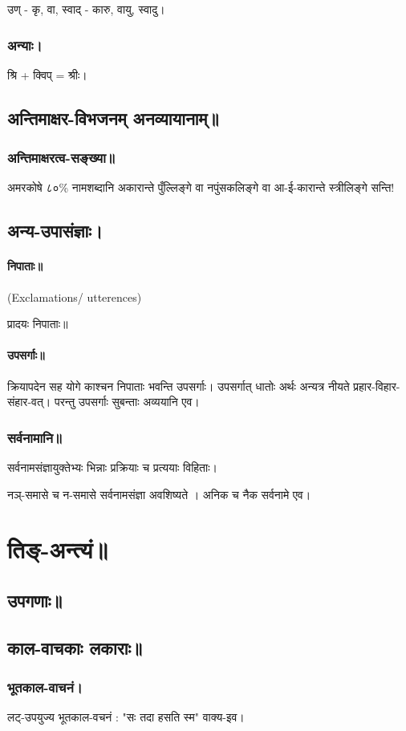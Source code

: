 \documentclass[oneside, article]{memoir}
\begin{document}
उण् - कृ, वा, स्वाद् - कारु, वायु, स्वादु।

\subsection{अन्याः।}
श्रि + क्विप् = श्रीः।

\section{अन्तिमाक्षर-विभजनम् अनव्यायानाम्॥}
\subsection{अन्तिमाक्षरत्व-सङ्ख्या॥}
अमरकोषे ८०\% नामशब्दानि अकारान्ते पुँल्लिङ्गे वा‌ नपुंसकलिङ्गे वा आ-ई-कारान्ते स्त्रीलिङ्गे सन्ति!

\section{अन्य-उपासंज्ञाः।}
\subsubsection{निपाताः॥}
(Exclamations/ utterences)

प्रादयः निपाताः॥

\subsubsection{उपसर्गाः॥}
क्रियापदेन सह योगे काश्चन निपाताः भवन्ति उपसर्गाः। उपसर्गात् धातोः अर्थः अन्यत्र नीयते प्रहार-विहार-संहार-वत्। परन्तु उपसर्गाः सुबन्ताः अव्ययानि एव।

\subsection{सर्वनामानि॥}
सर्वनामसंज्ञायुक्तेभ्यः भिन्नाः प्रक्रियाः च प्रत्ययाः विहिताः।

नञ्-समासे च न-समासे सर्वनामसंज्ञा अवशिष्यते । अनिक च नैक सर्वनामे एव।



\chapter{तिङ्-अन्त्यं॥}
\section{उपगणाः॥}
\section{काल-वाचकाः लकाराः॥}
\subsection{भूतकाल-वाचनं।}
लट्-उपयुज्य भूतकाल-वचनं : "सः तदा हसति स्म" वाक्य-इव। 
\end{document}
